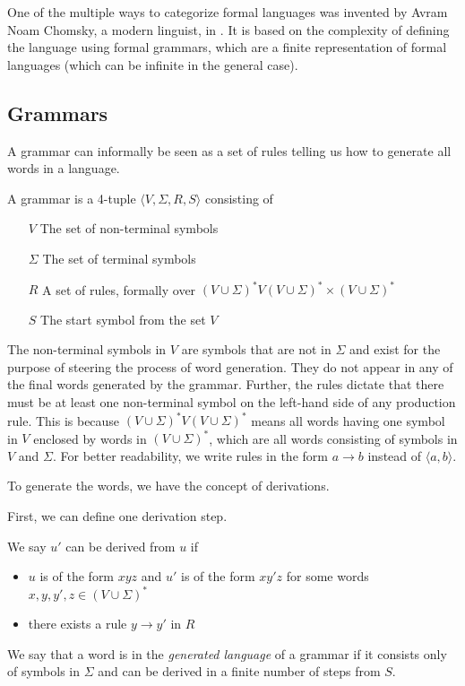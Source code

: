 One of the multiple ways to categorize formal languages was invented by Avram Noam Chomsky, a modern linguist, in \cite{Chomsky1959}.
It is based on the complexity of defining the language using formal grammars, which are a finite representation of formal languages (which can be infinite in the general case).

\subsection{Grammars}\label{subsec:grammars}

A grammar can informally be seen as a set of rules telling us how to generate all words in a language.

\begin{define}[Grammar]
    A grammar is a 4-tuple $\langle V, \Sigma, R, S \rangle$ consisting of
    \begin{itemize}
        \item[$V$] The set of non-terminal symbols
        \item[$\Sigma$] The set of terminal symbols
        \item[$R$] A set of rules, formally over $(V \cup \Sigma)^{*}V(V \cup \Sigma)^{*} \times (V \cup \Sigma)^{*}$
        \item[$S$] The start symbol from the set $V$
    \end{itemize}
\end{define}

The non-terminal symbols in $V$ are symbols that are not in $\Sigma$ and exist for the purpose of steering the process of word generation.
They do not appear in any of the final words generated by the grammar.
Further, the rules dictate that there must be at least one non-terminal symbol on the left-hand side of any production rule.
This is because $(V \cup \Sigma)^{*}V(V \cup \Sigma)^{*}$ means all words having one symbol in $V$ enclosed by words in $(V \cup \Sigma)^{*}$, which are all words consisting of symbols in $V$ and $\Sigma$.
For better readability, we write rules in the form $a \to b$ instead of $\langle a, b \rangle$.

To generate the words, we have the concept of derivations.
\begin{define}[Derivation]
    First, we can define one derivation step.

    We say $u'$ can be derived from $u$ if
    \begin{itemize}
        \setlength\itemsep{0.2em}
        \item $u$ is of the form $xyz$ and $u'$ is of the form $xy'z$ for some words $x, y, y', z \in (V \cup \Sigma)^*$
        \item there exists a rule $y \to y'$ in $R$
    \end{itemize}

    We say that a word is in the \emph{generated language} of a grammar if it consists only of symbols in $\Sigma$ and can be derived in a finite number of steps from $S$.
\end{define}

